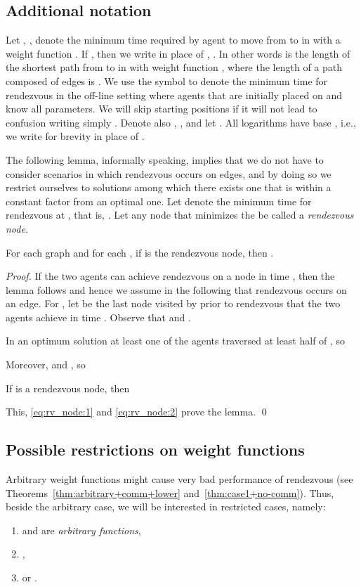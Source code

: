 \documentclass{llncs}
\begin{document}
\subsection{Additional notation}
Let , , 
denote the minimum time required by agent  to move from  to  in  with a weight function .
If , then we write  in place of , 
.
In other words  is the length of the shortest path from  to  in  with weight function , where the length of a path composed of edges  is .
We use the symbol  to denote the minimum time for rendezvous in the off-line setting where agents that are initially placed on  and  know all parameters. We will skip starting positions if it will not lead to confusion writing simply .
Denote also , , and let .
All logarithms have base , i.e., we write for brevity  in place of .

The following lemma, informally speaking, implies that we do not have to consider scenarios in which rendezvous occurs on edges, and by doing so we restrict ourselves to solutions among which there exists one that is within a constant factor from an optimal one.
Let  denote the minimum time for rendezvous at , that is, .
Let any node  that minimizes the  be called a \emph{rendezvous node}.

\begin{lemma} \label{lem:meet_on_nodes}
For each graph  and for each , if  is the rendezvous node, then .
\end{lemma}
\begin{proof}
If the two agents can achieve rendezvous on a node in time , then the lemma follows and hence we assume in the following that rendezvous occurs on an edge.
For , let  be the last node visited by  prior to rendezvous that the two agents achieve in time .
Observe that  and .

In an optimum solution at least one of the agents traversed at least half of , so

Moreover,   and  , so

If  is a rendezvous node, then

This, \eqref{eq:rv_node:1} and \eqref{eq:rv_node:2} prove the lemma.
\qed\end{proof}

\subsection{Possible restrictions on weight functions}

Arbitrary weight functions might cause very bad performance of rendezvous (see Theorems~\ref{thm:arbitrary+comm+lower} and~\ref{thm:case1+no-comm}).
Thus, beside the arbitrary case, we will be interested in restricted cases, namely:
\begin{enumerate}
\item \label{arbitraryW}  and  are \emph{arbitrary functions},
\item \label{monotoneEdges}  ,
\item \label{monotoneAgents}  or .
\end{enumerate}
\end{document}

